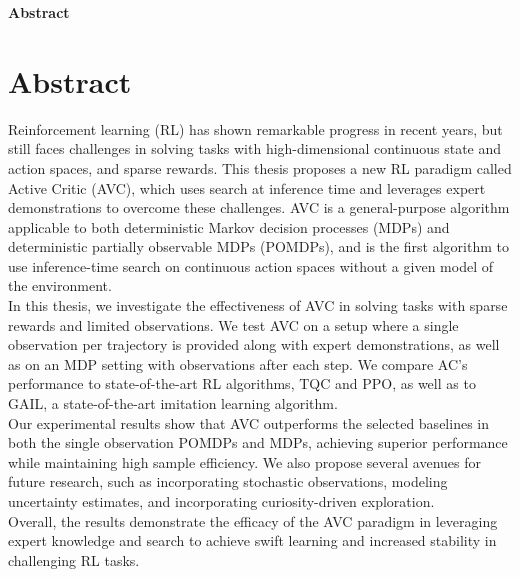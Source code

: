 \clearemptydoublepage
{}
{}

\vspace*{2cm}
\begin{center}
{\Large \textbf{Abstract}}
\end{center}
\vspace{1cm}

\chapter*{Abstract}
\label{chapter:Abstract}

Reinforcement learning (RL) has shown remarkable progress in recent years, but still faces challenges in solving tasks with high-dimensional 
continuous state and action spaces, and sparse rewards. This thesis proposes a new RL paradigm called Active Critic (AVC), which uses search at 
inference time and leverages expert demonstrations to overcome these challenges. AVC is a general-purpose algorithm applicable to both deterministic 
Markov decision processes (MDPs) and deterministic partially observable MDPs (POMDPs), and is the first algorithm to use inference-time search on continuous 
action spaces without a given model of the environment.\\

In this thesis, we investigate the effectiveness of AVC in solving tasks with sparse rewards and limited observations. We test AVC on 
a setup where a single observation per trajectory is provided along with expert demonstrations, as well as on an MDP setting with observations 
after each step. We compare AC's performance to state-of-the-art RL algorithms, TQC and PPO, as well as to GAIL, a state-of-the-art imitation 
learning algorithm. \\

Our experimental results show that AVC outperforms the selected baselines in both the single observation POMDPs and MDPs, achieving superior 
performance while maintaining high sample efficiency. We also propose several avenues for future research, such as incorporating stochastic 
observations, modeling uncertainty estimates, and incorporating curiosity-driven exploration.\\

Overall, the results demonstrate the efficacy of the AVC paradigm in leveraging expert knowledge and search to achieve swift learning and 
increased stability in challenging RL tasks.